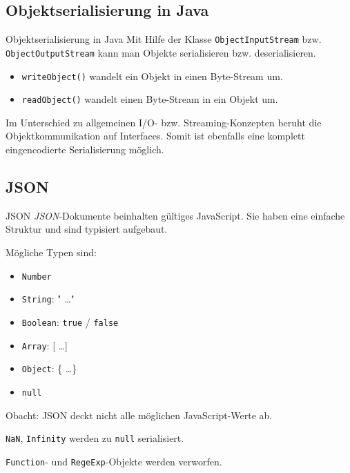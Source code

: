 \subsection{Objektserialisierung in Java}

\begin{bonus}{Objektserialisierung in Java}
    Mit Hilfe der Klasse \texttt{ObjectInputStream} bzw. \texttt{ObjectOutputStream} kann man Objekte serialisieren bzw. deserialisieren.
    
    \begin{itemize}
        \item \texttt{writeObject()} wandelt ein Objekt in einen Byte-Stream um.
        \item \texttt{readObject()} wandelt einen Byte-Stream in ein Objekt um.
    \end{itemize}
    
    Im Unterschied zu allgemeinen I/O- bzw. Streaming-Konzepten beruht die Objektkommunikation auf Interfaces.
    Somit ist ebenfalls eine komplett eingencodierte Serialisierung möglich.
\end{bonus}

\subsection{JSON}

\begin{defi}{JSON}
    \emph{JSON}-Dokumente beinhalten gültiges JavaScript.
    Sie haben eine einfache Struktur und sind typisiert aufgebaut.
    
    Mögliche Typen sind:
    \begin{itemize}
        \item \texttt{Number}
        \item \texttt{String}: " \ldots "
        \item \texttt{Boolean}: \texttt{true} / \texttt{false}
        \item \texttt{Array}: [ \ldots ]
        \item \texttt{Object}: \{ \ldots \}
        \item \texttt{null}
    \end{itemize}
    
    Obacht: JSON deckt nicht alle möglichen JavaScript-Werte ab.
    
    \texttt{NaN}, \texttt{Infinity} werden zu \texttt{null} serialisiert.
    
    \texttt{Function}- und \texttt{RegeExp}-Objekte werden verworfen.
\end{defi}

